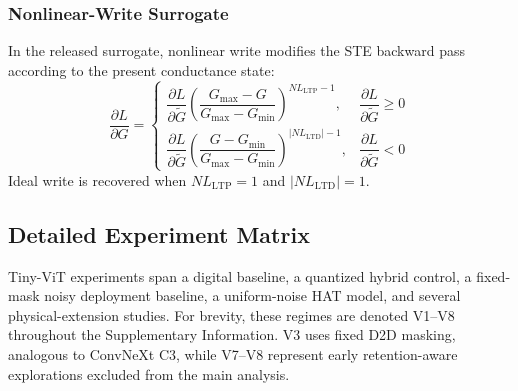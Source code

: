 \subsubsection{Nonlinear-Write Surrogate}
\label{subsec:supp-nl-surrogate}

In the released surrogate, nonlinear write modifies the STE backward pass according to the present conductance state:
\begin{equation}
    \frac{\partial L}{\partial G}
    =
    \begin{cases}
        \dfrac{\partial L}{\partial \tilde{G}}
        \left(\dfrac{G_{\max}-G}{G_{\max}-G_{\min}}\right)^{NL_{\mathrm{LTP}}-1},
        & \dfrac{\partial L}{\partial \tilde{G}} \ge 0 \\[10pt]
        \dfrac{\partial L}{\partial \tilde{G}}
        \left(\dfrac{G-G_{\min}}{G_{\max}-G_{\min}}\right)^{|NL_{\mathrm{LTD}}|-1},
        & \dfrac{\partial L}{\partial \tilde{G}} < 0
    \end{cases}
\label{eq:supp-nl-surrogate}
\end{equation}
Ideal write is recovered when $NL_{\mathrm{LTP}}=1$ and $|NL_{\mathrm{LTD}}|=1$.

\subsection{Detailed Experiment Matrix}
\label{subsec:detailed-experiment-matrix}

Tiny-ViT experiments span a digital baseline, a quantized hybrid control, a fixed-mask noisy deployment baseline, a uniform-noise HAT model, and several physical-extension studies. For brevity, these regimes are denoted V1--V8 throughout the Supplementary Information. V3 uses fixed D2D masking, analogous to ConvNeXt C3, while V7--V8 represent early retention-aware explorations excluded from the main analysis.

